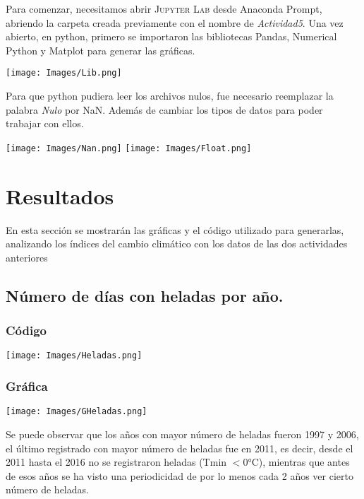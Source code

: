\documentclass{article}
\begin{document}
\noindent Para comenzar, necesitamos abrir \textsc{Jupyter Lab} desde Anaconda Prompt, abriendo la carpeta creada previamente con el nombre de \textit{Actividad5}.
Una vez abierto, en python, primero se importaron las bibliotecas Pandas, Numerical Python y Matplot para generar las gráficas.

\begin{center}
    \texttt{[image: Images/Lib.png]}
\end{center}

Para que python pudiera leer los archivos nulos, fue necesario reemplazar la palabra \textit{Nulo} por NaN. Además de cambiar los tipos de datos para poder trabajar con ellos.
\begin{center}
    \texttt{[image: Images/Nan.png]}
    \texttt{[image: Images/Float.png]}
\end{center}

\section{Resultados}
\noindent En esta sección se mostrarán las gráficas y el código utilizado para generarlas, analizando los índices del cambio climático con los datos de las dos actividades anteriores

\subsection{Número de días con heladas por año.}

\subsubsection{Código}

\begin{center}
    \texttt{[image: Images/Heladas.png]}
\end{center}

\subsubsection{Gráfica}
\begin{center}
    \texttt{[image: Images/GHeladas.png]}
\end{center}
Se puede observar que los años con mayor número de heladas fueron 1997 y 2006, el último registrado con mayor número de heladas fue en 2011, es decir, desde el 2011 hasta el 2016 no se registraron heladas (Tmin $< 0 $°C), mientras que antes de esos años se ha visto una periodicidad de por lo menos cada 2 años ver cierto número de heladas.
\end{document}
